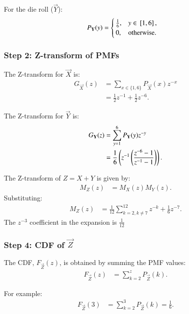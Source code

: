 \documentclass[journal]{IEEEtran}
\begin{document}
For the die roll ($\vec{Y}$):
\begin{align}
P_{\mathbf{Y}}(y) &= 
\begin{cases} 
\frac{1}{6}, & y \in {}\left[1,6\right], \\
0, & \text{otherwise}.
\end{cases}
\end{align}

\subsubsection*{Step 2: Z-transform of PMFs}
The Z-transform for $\vec{X}$ is:
\begin{align}
G_{\vec{X}}(z) &= \sum_{x \in \{1, 6\}} P_{\vec{X}}(x) z^{-x} \\
     &= \frac{1}{2} z^{-1} + \frac{1}{2} z^{-6}.
\end{align}

The Z-transform for $\vec{Y}$ is:
\begin{align}
G_{\mathbf{Y}}(z) &= \sum_{y=1}^{6} P_{\mathbf{Y}}(y) z^{-y} \\
     &= \frac{1}{6} \left(z^{-1}\left(\frac{z^{-6}-1}{z^{-1}-1}\right)\right).
\end{align}


The Z-transform of $Z = X + Y$ is given by:
\begin{align}
M_Z(z) &= M_X(z) M_Y(z).
\end{align}
Substituting:
\begin{align}
M_Z(z) &= \frac{1}{12} \sum_{k=2, k \neq 7}^{12} z^{-k} + \frac{1}{6} z^{-7}.
\end{align}
The $z^{-3}$ coefficient in the expansion is $\frac{1}{12}$

\subsubsection*{Step 4: CDF of $\vec{Z}$}
The CDF, $F_{\vec{Z}}(z)$, is obtained by summing the PMF values:
\begin{align}
F_{\vec{Z}}(z) &= \sum_{k=2}^{z} P_{\vec{Z}}(k).
\end{align}

For example:
\begin{align}
F_{\vec{Z}}(3) &= \sum_{k=2}^{3} P_{\vec{Z}}(k) = \frac{1}{6}.
\end{align}
\end{document}
